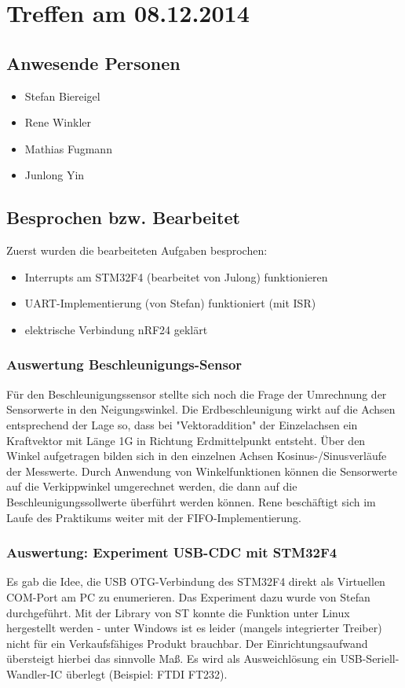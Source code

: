 \chapter{Treffen am 08.12.2014}
\section{Anwesende Personen}
\begin{itemize}
	\item Stefan Biereigel
	\item Rene Winkler
	\item Mathias Fugmann
	\item Junlong Yin
\end{itemize}

\section{Besprochen bzw. Bearbeitet}
Zuerst wurden die bearbeiteten Aufgaben besprochen:
\begin{itemize}
	\item Interrupts am STM32F4 (bearbeitet von Julong) funktionieren
	\item UART-Implementierung (von Stefan) funktioniert (mit ISR)
	\item elektrische Verbindung nRF24 geklärt
\end{itemize}

\subsection{Auswertung Beschleunigungs-Sensor}
Für den Beschleunigungssensor stellte sich noch die Frage der Umrechnung der Sensorwerte in den Neigungswinkel. Die Erdbeschleunigung wirkt auf die Achsen entsprechend der Lage so, dass bei "Vektoraddition" der Einzelachsen ein Kraftvektor mit Länge 1G in Richtung Erdmittelpunkt entsteht. Über den Winkel aufgetragen bilden sich in den einzelnen Achsen Kosinus-/Sinusverläufe der Messwerte. Durch Anwendung von Winkelfunktionen können die Sensorwerte auf die Verkippwinkel umgerechnet werden, die dann auf die Beschleunigungssollwerte überführt werden können. 
Rene beschäftigt sich im Laufe des Praktikums weiter mit der FIFO-Implementierung.

\subsection{Auswertung: Experiment USB-CDC mit STM32F4}
Es gab die Idee, die USB OTG-Verbindung des STM32F4 direkt als Virtuellen COM-Port am PC zu enumerieren. Das Experiment dazu wurde von Stefan durchgeführt. Mit der Library von ST konnte die Funktion unter Linux hergestellt werden - unter Windows ist es leider (mangels integrierter Treiber) nicht für ein Verkaufsfähiges Produkt brauchbar. Der Einrichtungsaufwand übersteigt hierbei das sinnvolle Maß. Es wird als Ausweichlösung ein USB-Seriell-Wandler-IC überlegt (Beispiel: FTDI FT232).

